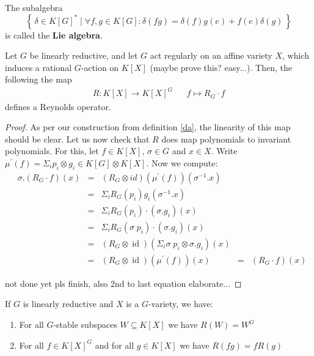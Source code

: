 \begin{remark}
  The subalgebra
  \begin{equation}
    \left\{\, \delta \in K[G]^\ast \mid \forall f,g \in K[G] : \delta (fg) = \delta (f) g(e) + f(e)\delta (g) \,\right\}
  \end{equation}
  is called the \textbf{Lie algebra}.
\end{remark}

\begin{proposition}
  Let $G$ be linearly reductive, and let $G$ act regularly on an affine variety $X$, which induces a rational $G$-action on $K[X]$ (maybe prove this? easy...).
  Then, the following the map
  \begin{align}
    R \colon K[X] \longrightarrow K[X]^G && f \mapsto R_G \cdot f
  \end{align}
  defines a Reynolds operator.
\end{proposition}

\begin{proof}
  As per our construction from definition \ref{da}, the linearity of this map should be clear.
  Let us now check that $R$ does map polynomials to invariant polynomials.
  For this, let $f \in K[X]$, $\sigma \in G$ and $x \in X$.
  Write $\mu^\prime (f) = \Sigma_i p_i \otimes g_i \in K[G] \otimes K[X] $.
  Now we compute:
  \begin{equation}
    \begin{aligned}
      &\sigma . \left( R_G \cdot f \right) (x)
      &=& \left( R_G \otimes id \right) \left( \mu^\prime(f) \right) \left( \sigma^{-1}.x \right) \\
      &&=& \Sigma_i R_G \left( p_i \right)  g_i \left( \sigma^{-1} . x \right) \\
      &&=& \Sigma_i R_G (p_i) \cdot (\sigma . g_i) (x)\\
      &&=& \Sigma_i R_G (\sigma \dot{\phantom{.}} p_i) \cdot (\sigma.g_i) (x)\\
      &&=&(R_G \otimes \operatorname{id}) \left( \Sigma_i \sigma \dot{\phantom{.}} p_i \otimes \sigma.g_i \right) (x) \\ 
      &&=& (R_G \otimes \operatorname{id}) (\mu^\prime (f)) (x)
      &=& (R_G \cdot f) (x)
    \end{aligned}
\end{equation}

  not done yet pls finish, also 2nd to last equation elaborate...
\end{proof}

\begin{lemma}
  If $G$ is linearly reductive and $X$ is a $G$-variety, we have:
  \begin{enumerate}
  \item For all $G$-stable subspaces $W \subseteq K[X]$ we have $R(W) = W^G$
  \item For all $f \in K[X]^G$ and for all $g \in K[X]$ we have $R(fg) = fR(g)$
  \end{enumerate}
\end{lemma}

